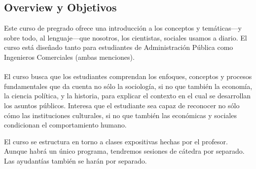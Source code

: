 \documentclass[letterpaper]{article}
\renewenvironment{itemize}{
  \begin{list}{}{
    \setlength{\leftmargin}{1.5em}
  }
}{
  \end{list}
}
\begin{document}
\subsection*{Overview y Objetivos}

Este {\color{blue}curso de pregrado} ofrece una introducci\'on a los conceptos y tem\'aticas---y sobre todo, al lenguaje---que nosotros, los cientistas, sociales usamos a diario. El curso est\'a dise\~nado tanto para estudiantes de Administraci\'on P\'ublica como Ingenieros Comerciales (ambas menciones). 
\\
\\
El curso busca que los estudiantes comprendan los enfoques, conceptos y procesos fundamentales que da cuenta no s\'olo la sociolog\'ia, si no que tambi\'en la econom\'ia, la ciencia pol\'itica, y la historia, para explicar el contexto en el cual se desarrollan los asuntos p\'ublicos. Interesa que el estudiante sea capaz de reconocer no s\'olo c\'omo las instituciones culturales, si no que tambi\'en las econ\'omicas y sociales condicionan el comportamiento humano.


\begin{itemize}
    \item[\Pointinghand] El curso se estructura en torno a clases expositivas hechas por el profesor. Aunque habr\'a un \'unico programa, {\color{blue}tendremos sesiones de c\'atedra por separado}. Las ayudant\'ias tambi\'en se har\'an por separado.
\end{itemize}
\end{document}
